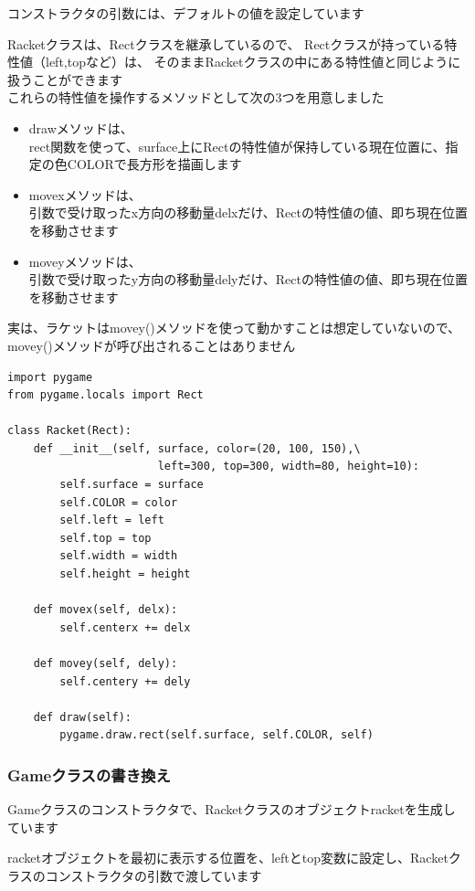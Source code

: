 \documentclass[uplatex,a4paper,11pt,oneside,openany]{jsbook}
\begin{document}
コンストラクタの引数には、デフォルトの値を設定しています

Racketクラスは、Rectクラスを継承しているので、
Rectクラスが持っている特性値（left,topなど）は、
そのままRacketクラスの中にある特性値と同じように扱うことができます\\

これらの特性値を操作するメソッドとして次の3つを用意しました

\begin{itemize}
  \item drawメソッドは、\\rect関数を使って、surface上にRectの特性値が保持している現在位置に、指定の色COLORで長方形を描画します
  \item movexメソッドは、\\引数で受け取ったx方向の移動量delxだけ、Rectの特性値の値、即ち現在位置を移動させます
  \item moveyメソッドは、\\引数で受け取ったy方向の移動量delyだけ、Rectの特性値の値、即ち現在位置を移動させます
\end{itemize}

実は、ラケットはmovey()メソッドを使って動かすことは想定していないので、
movey()メソッドが呼び出されることはありません

\begin{lstlisting}[caption=Racketクラス,label=p4]
import pygame
from pygame.locals import Rect

class Racket(Rect):
    def __init__(self, surface, color=(20, 100, 150),\
                       left=300, top=300, width=80, height=10):
        self.surface = surface
        self.COLOR = color
        self.left = left
        self.top = top
        self.width = width
        self.height = height

    def movex(self, delx):
        self.centerx += delx

    def movey(self, dely):
        self.centery += dely

    def draw(self):
        pygame.draw.rect(self.surface, self.COLOR, self)
\end{lstlisting}

\subsubsection{Gameクラスの書き換え}

Gameクラスのコンストラクタで、Racketクラスのオブジェクトracketを生成しています

racketオブジェクトを最初に表示する位置を、leftとtop変数に設定し、Racketクラスのコンストラクタの引数で渡しています
\end{document}
